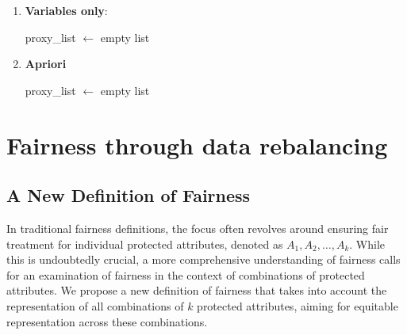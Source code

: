 \documentclass[12pt,a4paper,openright,twoside]{book}
\begin{document}
\begin{enumerate}
    \item \textbf{Variables only}: 
            
\begin{algorithm}[H]
    proxy\_list $\gets$ empty list\;
\end{algorithm}

    \item \textbf{Apriori}
    \begin{algorithm}[H]
    proxy\_list $\gets$ empty list\;
\end{algorithm}
\end{enumerate}
\newpage

\section{Fairness through data rebalancing}
\subsection{A New Definition of Fairness}
In traditional fairness definitions, the focus often revolves around ensuring fair treatment for individual protected attributes, denoted as $A_1, A_2, \ldots, A_k$. While this is undoubtedly crucial, a more comprehensive understanding of fairness calls for an examination of fairness in the context of combinations of protected attributes. We propose a new definition of fairness that takes into account the representation of all combinations of $k$ protected attributes, aiming for equitable representation across these combinations.
\end{document}
